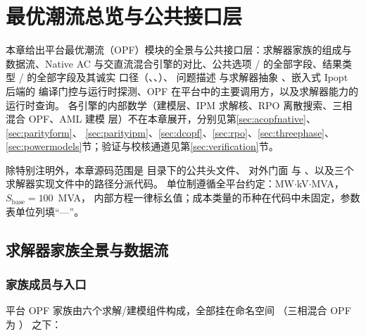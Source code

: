 \section{最优潮流总览与公共接口层}\label{sec:overview}

本章给出平台最优潮流（OPF）模块的全景与公共接口层：求解器家族的组成与
数据流、Native AC 与交直流混合引擎的对比、公共选项 /
的全部字段、结果类型 / 的全部字段及其诚实
口径（、、）、
问题描述  与求解器抽象 、嵌入式 Ipopt 后端的
编译门控与运行时探测、OPF 在平台中的主要调用方，以及求解器能力的运行时查询。
各引擎的内部数学（建模层、IPM 求解核、RPO 离散搜索、三相混合 OPF、AML 建模
层）不在本章展开，分别见第\ref{sec:acopfnative}、\ref{sec:parityform}、
\ref{sec:parityipm}、\ref{sec:dcopf}、\ref{sec:rpo}、\ref{sec:threephase}、
\ref{sec:powermodels}节；验证与校核通道见第\ref{sec:verification}节。

除特别注明外，本章源码范围是
 目录下的公共头文件、
对外门面  与
、以及三个求解器实现文件中的路径分派代码。
单位制遵循全平台约定：MW$\cdot$kV$\cdot$MVA，$S_{\mathrm{base}}=100$~MVA，
内部方程一律标幺值；成本类量的币种在代码中未固定，参数表单位列填“—”。

\subsection{求解器家族全景与数据流}\label{subsec:overview-family}

\subsubsection*{家族成员与入口}

平台 OPF 家族由六个求解/建模组件构成，全部挂在命名空间
（三相混合 OPF 为 ）
之下：

